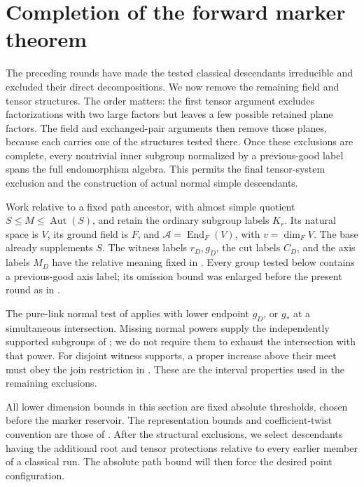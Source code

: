 \section{Completion of the forward marker theorem}\label{sec:forward-completion}

The preceding rounds have made the tested classical descendants
irreducible and excluded their direct decompositions.  We now remove
the remaining field and tensor structures.  The order matters: the
first tensor argument excludes factorizations with two large factors
but leaves a few possible retained plane factors.  The field and
exchanged-pair arguments then remove those planes, because each carries
one of the structures tested there.  Once these exclusions are complete,
every nontrivial inner subgroup normalized by a previous-good label
spans the full endomorphism algebra.  This permits the final
tensor-system exclusion and the construction of actual normal simple
descendants.

Work relative to a fixed path ancestor, with almost simple quotient
\(S\le M\le\operatorname{Aut}(S)\), and retain the ordinary subgroup
labels \(K_r\).  Its natural space is \(V\), its ground field is \(F\),
and \(\mathcal A=\operatorname{End}_F(V)\), with \(v=\dim_F V\).
The base already supplements \(S\).  The witness labels \(r_D,g_D\),
the cut labels \(C_D\), and the axis labels \(M_D\) have the relative
meaning fixed in .  Every group tested below
contains a previous-good axis label; its omission bound was enlarged
before the present round as in .

The pure-link normal test of  applies with lower
endpoint \(g_D\), or \(g_*\) at a simultaneous intersection.  Missing
normal powers supply the independently supported subgroups of
; we do not require them to exhaust the
intersection with that power.  For disjoint witness supports, a proper
increase above their meet must obey the join restriction in
.  These are the interval properties used in the
remaining exclusions.

All lower dimension bounds in this section are fixed absolute
thresholds, chosen before the marker reservoir.  The representation
bounds and coefficient-twist convention are those of
.  After the structural
exclusions, we select descendants having the additional root and tensor
protections relative to every earlier member of a classical run.  The
absolute path bound will then force the desired point configuration.

